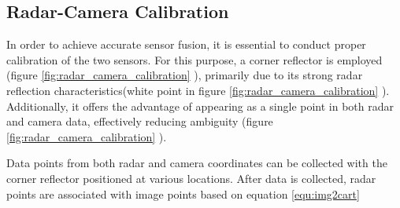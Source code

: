 \subsection{Radar-Camera Calibration}
In order to achieve accurate sensor fusion, it is essential to conduct proper calibration of the two sensors. 
For this purpose, a corner reflector is employed (figure \ref*{fig:radar_camera_calibration} ), primarily due to its strong radar reflection characteristics(white point in figure \ref*{fig:radar_camera_calibration} ). 
Additionally, it offers the advantage of appearing as a single point in both radar and camera data, effectively reducing ambiguity (figure \ref*{fig:radar_camera_calibration} ).

Data points from both radar and camera coordinates can be collected with the corner reflector positioned at various locations.
After data is collected, radar points are associated with image points based on equation \ref*{equ:img2cart}
